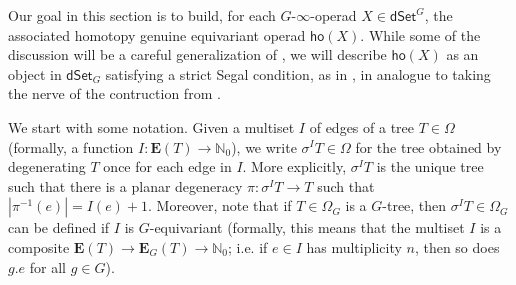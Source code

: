 \documentclass[a4paper,10pt
,draft
]{article}%
\numberwithin{equation}{section}
\numberwithin{figure}{section}
\theoremstyle{definition} %
\newcommand{\1}{\ensuremath{\mathbbm 1}}%
\begin{document}
Our goal in this section is to build,
for each $G$-$\infty$-operad $X \in \mathsf{dSet}^G$,
the associated homotopy genuine equivariant operad
$\mathsf{ho} (X)$.
While some of the discussion will be a careful generalization of \cite[\S 6]{MW09},
we will describe $\mathsf{ho} (X)$ as an object in
$\mathsf{dSet}_G$
satisfying a strict Segal condition, as in \cite[\S 3.3]{BP_edss},
in analogue to taking the nerve of the contruction from \cite{MW09}.

We start with some notation. 
Given a multiset $I$ of edges of a tree $T \in \Omega$
(formally, a function 
$I \colon \boldsymbol{E}(T) \to \mathbb{N}_0$),
we write $\sigma^I T \in \Omega$
for the tree obtained by degenerating $T$ once for each edge in $I$.
More explicitly, $\sigma^I T$ is the unique tree such that there is a planar degeneracy
$\pi \colon \sigma^I T \to T$
such that $|\pi^{-1}(e)| = I(e) + 1$.
Moreover,
note that if $T\in \Omega_G$ is a $G$-tree, 
then $\sigma^{I} T \in \Omega_{G}$
can be defined if $I$ is $G$-equivariant
(formally, this means that the multiset $I$ is a composite
$\boldsymbol{E}(T) \to \boldsymbol{E}_G(T)
\to \mathbb{N}_0$;
i.e. if $e \in I$ has multiplicity $n$, then so does $ g.e$ for all $g \in G$).
\end{document}
